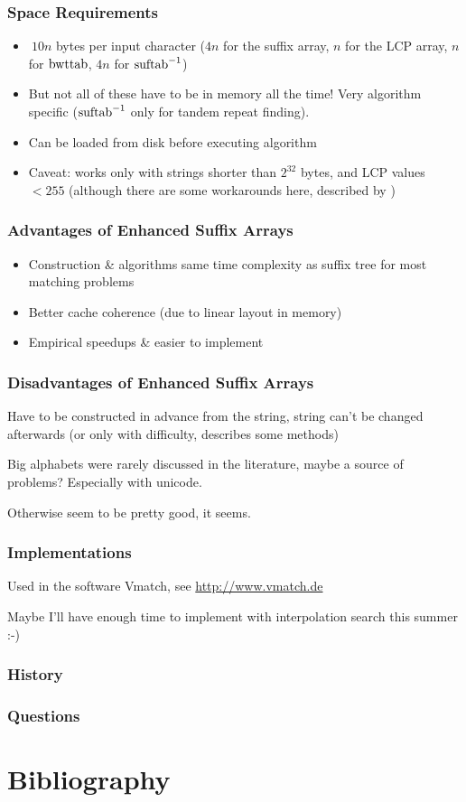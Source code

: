 \documentclass[compress,handout]{beamer} %
\begin{document}
\begin{frame}
	\frametitle{Space Requirements}
	\begin{itemize}
		\item $~10n$ bytes per input character ($4n$ for the suffix array, $n$ for the LCP array, $n$ for $\hbox{bwttab}$, $4n$ for $\hbox{suftab}^{-1}$)
		\item But not all of these have to be in memory all the time! Very algorithm specific ($\hbox{suftab}^{-1}$ only for tandem repeat finding).
		\item Can be loaded from disk before executing algorithm
		\item Caveat: works only with strings shorter than $2^{32}$ bytes, and LCP values $<255$ (although there are some workarounds here, described by \cite{abouelhoda2004replacing})
	\end{itemize}
\end{frame}

\begin{frame}
	\frametitle{Advantages of Enhanced Suffix Arrays}
	\begin{itemize}
		\item Construction \& algorithms same time complexity as suffix tree for most matching problems
		\item Better cache coherence (due to linear layout in memory)
		\item Empirical speedups \& easier to implement
	\end{itemize}
\end{frame}

\begin{frame}
	\frametitle{Disadvantages of Enhanced Suffix Arrays}
	Have to be constructed in advance from the string, string
	can't be changed afterwards (or only with difficulty,
	\cite{salson2010dynamic} describes some methods)

	Big alphabets were rarely discussed in the literature, maybe a
	source of problems? Especially with unicode.

	Otherwise seem to be pretty good, it seems.
\end{frame}

\begin{frame}
	\frametitle{Implementations}
	Used in the software Vmatch, see \href{http://www.vmatch.de}{http://www.vmatch.de}

	\vspace{1cm}

	Maybe I'll have enough time to implement with interpolation
	search this summer :-)
\end{frame}

\begin{frame}
	\frametitle{History}
\end{frame}

\begin{frame}
	\frametitle{Questions}

	\Huge{\textinterrobang}
\end{frame}

\section{Bibliography}



\end{document}

